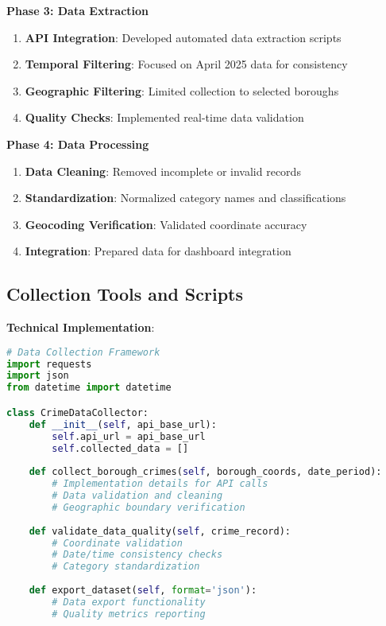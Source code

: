 \documentclass[12pt,a4paper]{article}
\begin{document}
\textbf{Phase 3: Data Extraction}
\begin{enumerate}
    \item \textbf{API Integration}: Developed automated data extraction scripts
    \item \textbf{Temporal Filtering}: Focused on April 2025 data for consistency
    \item \textbf{Geographic Filtering}: Limited collection to selected boroughs
    \item \textbf{Quality Checks}: Implemented real-time data validation
\end{enumerate}

\textbf{Phase 4: Data Processing}
\begin{enumerate}
    \item \textbf{Data Cleaning}: Removed incomplete or invalid records
    \item \textbf{Standardization}: Normalized category names and classifications
    \item \textbf{Geocoding Verification}: Validated coordinate accuracy
    \item \textbf{Integration}: Prepared data for dashboard integration
\end{enumerate}

\subsection{Collection Tools and Scripts}

\textbf{Technical Implementation}:
\begin{lstlisting}[language=Python, caption=Data Collection Framework]
# Data Collection Framework
import requests
import json
from datetime import datetime

class CrimeDataCollector:
    def __init__(self, api_base_url):
        self.api_url = api_base_url
        self.collected_data = []
    
    def collect_borough_crimes(self, borough_coords, date_period):
        # Implementation details for API calls
        # Data validation and cleaning
        # Geographic boundary verification
        
    def validate_data_quality(self, crime_record):
        # Coordinate validation
        # Date/time consistency checks
        # Category standardization
        
    def export_dataset(self, format='json'):
        # Data export functionality
        # Quality metrics reporting
\end{lstlisting}
\end{document}
